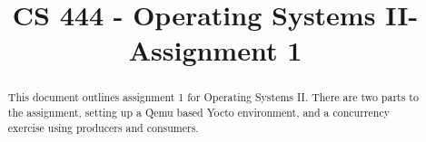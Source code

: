 \documentclass[10pt,onecolumn,journal,draftclsnofoot]{IEEEtran}
\begin{document}
\begin{titlepage}
\title{CS 444 - Operating Systems II- Assignment 1}
\author
{
}
	\maketitle
	\vspace{4cm}
	\begin{abstract}
		\noindent This document outlines assignment 1 for Operating Systems II.
		There are two parts to the assignment, setting up a Qemu based Yocto environment, and a concurrency exercise using producers and consumers.
	\end{abstract}

\end{titlepage}

\newpage
\end{document}
